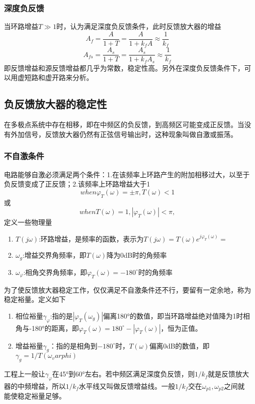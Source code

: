 \documentclass{ctexart}
\begin{document}
\subsubsection{深度负反馈}
当环路增益$T\gg 1$时，认为满足深度负反馈条件，此时反馈放大器的增益
\begin{equation}
    A_f=\dfrac{A}{1+T}=\dfrac{A}{1+k_f A} \approx \dfrac{1}{k_f}
\end{equation}
\begin{equation}
    A_{fs}=\dfrac{A_s}{1+T}=\dfrac{A_s}{1+k_f A_s} \approx \dfrac{1}{k_f}
\end{equation}
即反馈增益和源反馈增益都几乎为常数，稳定性高。另外在深度负反馈条件下，可以用虚短路和虚开路来分析。
\subsection{负反馈放大器的稳定性}
在多极点系统中存在相移，即在中频区的负反馈，到高频区可能变成正反馈。当没有外加信号，反馈放大器仍然有正弦信号输出时，这种现象叫做自激或振荡。

\subsubsection{不自激条件}
电路能够自激必须满足两个条件：1.在该频率上环路产生的附加相移过大，以至于负反馈变成了正反馈；2.该频率上环路增益大于1
\begin{equation}
   when \varphi_T(\omega)=\pm \pi ,T(\omega)<1 
\end{equation}
或\begin{equation}
    when T(\omega)=1, |\varphi_T(\omega)|< \pi ,
 \end{equation}
定义一些物理量
\begin{enumerate}
    \item $T(j\omega)$:环路增益，是频率的函数，表示为$T(j\omega)=T(\omega)e^{j\varphi_T(\omega)}=$
    \item $\omega_g$:增益交界角频率，即$T(\omega)$降为0dB时的角频率
    \item $\omega_\varphi$:相角交界角频率，即$\varphi_T(\omega)=-180^\circ$时的角频率
\end{enumerate}
为了使反馈放大器稳定工作，仅仅满足不自激条件还不行，要留有一定余地，称为稳定裕量。定义如下
\begin{enumerate}
    \item 相位裕量$\gamma_\varphi$:指的是$|\varphi_T(\omega_g)|$偏离180°的数值，即当环路增益绝对值降为1时相角与-180°的距离，即$\varphi_T(\omega)=180^\circ-|\varphi_T(\omega)|$，恒为正值。
    \item 增益裕量$\gamma_g$：指的是相角到$-180^\circ$时，$T(\omega)$偏离0dB的数值，即$\gamma_g=1/T(\omega_varphi)$
\end{enumerate}
工程上一般让$\gamma_\varphi$在45°到60°左右。若中频区满足深度负反馈，则$1/k_f$就是反馈放大器的中频增益，所以$1/k_f$水平线又叫做反馈增益线。一般$1/k_f$交在$\omega_{p1},\omega_{p2}$之间就能使稳定裕量足够。
\end{document}
